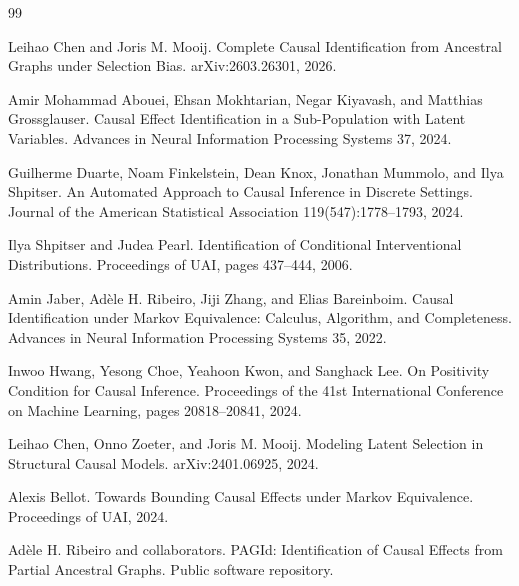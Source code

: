 \documentclass{article}
\begin{document}
\begin{thebibliography}{99}

   Leihao Chen and Joris M. Mooij. Complete Causal Identification from Ancestral Graphs under Selection Bias. arXiv:2603.26301, 2026.

   Amir Mohammad Abouei, Ehsan Mokhtarian, Negar Kiyavash, and Matthias Grossglauser. Causal Effect Identification in a Sub-Population with Latent Variables. Advances in Neural Information Processing Systems 37, 2024.

   Guilherme Duarte, Noam Finkelstein, Dean Knox, Jonathan Mummolo, and Ilya Shpitser. An Automated Approach to Causal Inference in Discrete Settings. Journal of the American Statistical Association 119(547):1778--1793, 2024.

   Ilya Shpitser and Judea Pearl. Identification of Conditional Interventional Distributions. Proceedings of UAI, pages 437--444, 2006.

   Amin Jaber, Adèle H. Ribeiro, Jiji Zhang, and Elias Bareinboim. Causal Identification under Markov Equivalence: Calculus, Algorithm, and Completeness. Advances in Neural Information Processing Systems 35, 2022.

   Inwoo Hwang, Yesong Choe, Yeahoon Kwon, and Sanghack Lee. On Positivity Condition for Causal Inference. Proceedings of the 41st International Conference on Machine Learning, pages 20818--20841, 2024.

   Leihao Chen, Onno Zoeter, and Joris M. Mooij. Modeling Latent Selection in Structural Causal Models. arXiv:2401.06925, 2024.

   Alexis Bellot. Towards Bounding Causal Effects under Markov Equivalence. Proceedings of UAI, 2024.

   Adèle H. Ribeiro and collaborators. PAGId: Identification of Causal Effects from Partial Ancestral Graphs. Public software repository.

\end{thebibliography}
\end{document}
